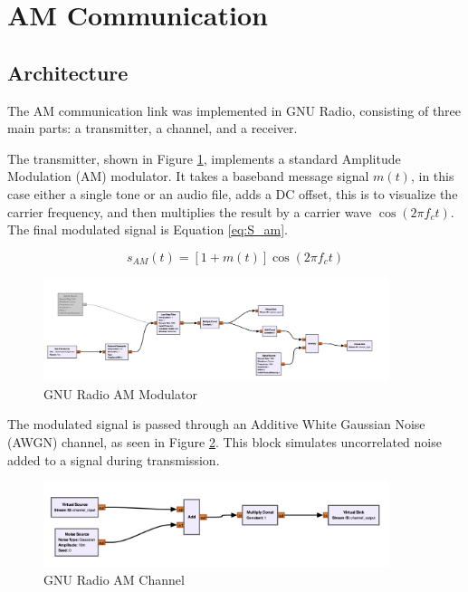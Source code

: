 \section{AM Communication}

\subsection{Architecture}

The AM communication link was implemented in GNU Radio, consisting of three main parts: a transmitter, a channel, and a receiver.

The transmitter, shown in Figure \ref{fig:GNU_am_mod}, implements a standard Amplitude Modulation (AM) modulator. It takes a baseband message signal $m(t)$, in this case either a single tone or an audio file, adds a DC offset, this is to visualize the carrier frequency, and then multiplies the result by a carrier wave $\cos(2\pi f_c t)$. The final modulated signal is Equation \ref{eq:S_am}.

\begin{equation}
    s_{AM}(t) = [1 + m(t)] \cos(2\pi f_c t)
    \label{eq:S_am}
\end{equation}


\begin{figure}[H]
    \centering
    \includegraphics*[width=0.9\textwidth]{Images/GNU_AM_Mod.png}
    \caption{GNU Radio AM Modulator}
    \label{fig:GNU_am_mod}
\end{figure}

The modulated signal is passed through an Additive White Gaussian Noise (AWGN) channel, as seen in Figure \ref{fig:gnu_am_channel}. This block simulates uncorrelated noise added to a signal during transmission.

\begin{figure}[h]
    \centering
    \includegraphics*[width=0.9\textwidth]{images/GNU_am_Channel.png}
    \caption{GNU Radio AM Channel}
    \label{fig:gnu_am_channel}
\end{figure}

